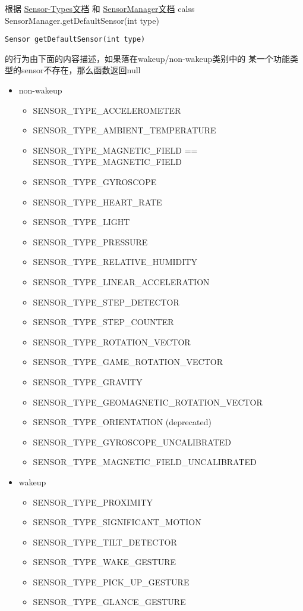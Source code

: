 \par{
根据
\href{https://source.android.com/devices/sensors/sensor-types.html}
     {Sensor-Types文档}
和
\href{https://developer.android.com/reference/android/hardware/SensorManager.html}{SensorManager文档}
calss SensorManager.getDefaultSensor(int type)
\begin{lstlisting}
Sensor getDefaultSensor(int type)
\end{lstlisting}
的行为由下面的内容描述，如果落在wakeup/non-wakeup类别中的
某一个功能类型的sensor不存在，那么函数返回null
\begin{itemize}
    \item non-wakeup
      \begin{itemize}
      \item SENSOR\_TYPE\_ACCELEROMETER
      \item SENSOR\_TYPE\_AMBIENT\_TEMPERATURE
      \item SENSOR\_TYPE\_MAGNETIC\_FIELD == SENSOR\_TYPE\_MAGNETIC\_FIELD
      \item SENSOR\_TYPE\_GYROSCOPE
      \item SENSOR\_TYPE\_HEART\_RATE
      \item SENSOR\_TYPE\_LIGHT
      \item SENSOR\_TYPE\_PRESSURE
      \item SENSOR\_TYPE\_RELATIVE\_HUMIDITY
      \item SENSOR\_TYPE\_LINEAR\_ACCELERATION
      \item SENSOR\_TYPE\_STEP\_DETECTOR
      \item SENSOR\_TYPE\_STEP\_COUNTER
      \item SENSOR\_TYPE\_ROTATION\_VECTOR
      \item SENSOR\_TYPE\_GAME\_ROTATION\_VECTOR
      \item SENSOR\_TYPE\_GRAVITY
      \item SENSOR\_TYPE\_GEOMAGNETIC\_ROTATION\_VECTOR
      \item SENSOR\_TYPE\_ORIENTATION (deprecated)
      \item SENSOR\_TYPE\_GYROSCOPE\_UNCALIBRATED
      \item SENSOR\_TYPE\_MAGNETIC\_FIELD\_UNCALIBRATED
      \end{itemize}
    \item wakeup
      \begin{itemize}
      \item SENSOR\_TYPE\_PROXIMITY
      \item SENSOR\_TYPE\_SIGNIFICANT\_MOTION
      \item SENSOR\_TYPE\_TILT\_DETECTOR
      \item SENSOR\_TYPE\_WAKE\_GESTURE
      \item SENSOR\_TYPE\_PICK\_UP\_GESTURE
      \item SENSOR\_TYPE\_GLANCE\_GESTURE
      \end{itemize}
\end{itemize}

}
